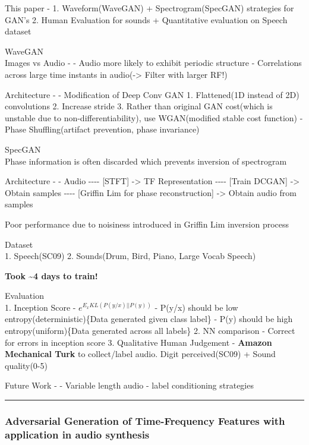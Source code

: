 \documentclass[11pt]{article}
\begin{document}
    This paper - 1. Waveform(WaveGAN) + Spectrogram(SpecGAN) strategies for
GAN's 2. Human Evaluation for sounds + Quantitative evaluation on Speech
dataset

    WaveGAN\\
Images vs Audio - - Audio more likely to exhibit periodic structure -
Correlations across large time instants in audio(-\textgreater{} Filter
with larger RF!)

Architecture - - Modification of Deep Conv GAN 1. Flattened(1D instead
of 2D) convolutions 2. Increase stride 3. Rather than original GAN
cost(which is unstable due to non-differentiability), use WGAN(modified
stable cost function) - Phase Shuffling(artifact prevention, phase
invariance)

SpecGAN\\
Phase information is often discarded which prevents inversion of
spectrogram

Architecture - - Audio -\/-\/-\/- {[}STFT{]} -\textgreater{} TF
Representation -\/-\/-\/- {[}Train DCGAN{]} -\textgreater{} Obtain
samples -\/-\/-\/- {[}Griffin Lim for phase reconstruction{]}
-\textgreater{} Obtain audio from samples

Poor performance due to noisiness introduced in Griffin Lim inversion
process

    Dataset\\
1. Speech(SC09) 2. Sounds(Drum, Bird, Piano, Large Vocab Speech)

\textbf{Took \textasciitilde{}4 days to train!}

Evaluation\\
1. Inception Score - \(e^{E_{x}KL(P(y/x)||P(y))}\) - P(y/x) should be
low entropy(deterministic)\{Data generated given class label\} - P(y)
should be high entropy(uniform)\{Data generated across all labels\} 2.
NN comparison - Correct for errors in inception score 3. Qualitative
Human Judgement - \textbf{Amazon Mechanical Turk} to collect/label
audio. Digit perceived(SC09) + Sound quality(0-5)

    Future Work - - Variable length audio - label conditioning strategies

    \begin{center}\rule{0.5\linewidth}{\linethickness}\end{center}

\subsubsection{Adversarial Generation of Time-Frequency Features with
application in audio
synthesis}\label{adversarial-generation-of-time-frequency-features-with-application-in-audio-synthesis}
\end{document}

